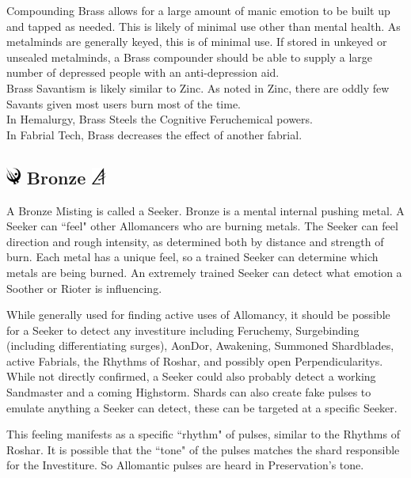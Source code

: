 \documentclass[conference]{IEEEtran}
\begin{document}
Compounding Brass allows for a large amount of manic emotion to be built up and tapped as needed.  This is likely of minimal use other than mental health.  As metalminds are generally keyed, this is of minimal use.  If stored in unkeyed or unsealed metalminds, a Brass compounder should be able to supply a large number of depressed people with an anti-depression aid.\\

Brass Savantism is likely similar to Zinc.  As noted in Zinc, there are oddly few Savants given most users burn most of the time. \\

In Hemalurgy, Brass Steels the Cognitive Feruchemical powers.\\

In Fabrial Tech, Brass decreases the effect of another fabrial. 
\subsection*{\includegraphics[height=1em]{images/Bronze.png}  Bronze \includegraphics[height=1em]{images/Bronze_(Feruchemy).png}}
A Bronze Misting is called a Seeker.  Bronze is a mental internal pushing metal. 
A Seeker can ``feel" other Allomancers who are burning metals.  The Seeker can feel direction and rough intensity, as determined both by distance and strength of burn.  Each metal has a unique feel, so a trained Seeker can determine which metals are being burned.  An extremely trained Seeker can detect what emotion a Soother or Rioter is influencing. 

While generally used for finding active uses of Allomancy, it should be possible for a Seeker to detect any investiture including Feruchemy, Surgebinding (including differentiating surges), AonDor, Awakening, Summoned Shardblades, active Fabrials, the Rhythms of Roshar, and possibly open Perpendicularitys.  While not directly confirmed, a Seeker could also probably detect a working Sandmaster and a coming Highstorm.  Shards can also create fake pulses to emulate anything a Seeker can detect, these can be targeted at a specific Seeker.

This feeling manifests as a specific ``rhythm" of pulses, similar to the Rhythms of Roshar.  It is possible that the ``tone" of the pulses matches the shard responsible for the Investiture.  So Allomantic pulses are heard in Preservation's tone.
\end{document}
